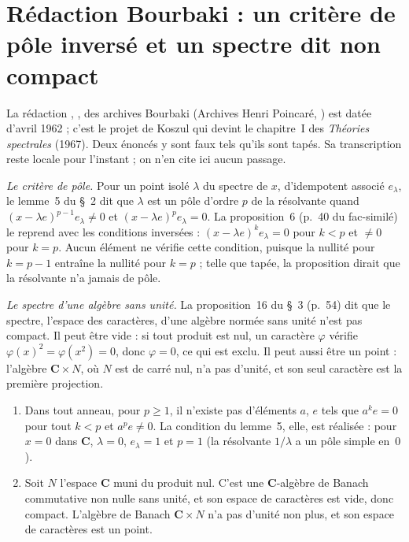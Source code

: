 \section[Rédaction Bourbaki \redac{380} : deux énoncés faux tels que tapés]{Rédaction Bourbaki  : un critère de pôle inversé et un spectre dit non compact\protect{}}\label{sec:bourbaki-380}

La rédaction , , des archives Bourbaki (Archives Henri Poincaré, ) est datée d'avril 1962 ; c'est le projet de Koszul qui devint le chapitre~I des \emph{Théories spectrales} (1967). Deux énoncés y sont faux tels qu'ils sont tapés. Sa transcription reste locale pour l'instant ; on n'en cite ici aucun passage.

\emph{Le critère de pôle.} Pour un point isolé $\lambda$ du spectre de $x$, d'idempotent associé $e_\lambda$, le lemme~5 du §~2 dit que $\lambda$ est un pôle d'ordre $p$ de la résolvante quand $(x - \lambda e)^{p-1} e_\lambda \neq 0$ et $(x - \lambda e)^p e_\lambda = 0$. La proposition~6 (p.~40 du fac-similé) le reprend avec les conditions inversées : $(x - \lambda e)^k e_\lambda = 0$ pour $k < p$ et $\neq 0$ pour $k = p$. Aucun élément ne vérifie cette condition, puisque la nullité pour $k = p - 1$ entraîne la nullité pour $k = p$ ; telle que tapée, la proposition dirait que la résolvante n'a jamais de pôle.

\emph{Le spectre d'une algèbre sans unité.} La proposition~16 du §~3 (p.~54) dit que le spectre, l'espace des caractères, d'une algèbre normée sans unité n'est pas compact. Il peut être vide : si tout produit est nul, un caractère $\varphi$ vérifie $\varphi(x)^2 = \varphi(x^2) = 0$, donc $\varphi = 0$, ce qui est exclu. Il peut aussi être un point : l'algèbre $\mathbf C \times N$, où $N$ est de carré nul, n'a pas d'unité, et son seul caractère est la première projection.

\begin{encadre}
\begin{contrexemple}\mbox{}
\begin{enumerate}
\item[a)] Dans tout anneau, pour $p \ge 1$, il n'existe pas d'éléments $a$, $e$ tels que $a^k e = 0$ pour tout $k < p$ et $a^p e \neq 0$. La condition du lemme~5, elle, est réalisée : pour $x = 0$ dans $\mathbf C$, $\lambda = 0$, $e_\lambda = 1$ et $p = 1$ (la résolvante $1/\lambda$ a un pôle simple en~$0$).
\item[b)] Soit $N$ l'espace $\mathbf C$ muni du produit nul. C'est une $\mathbf C$-algèbre de Banach commutative non nulle sans unité, et son espace de caractères est vide, donc compact. L'algèbre de Banach $\mathbf C \times N$ n'a pas d'unité non plus, et son espace de caractères est un point.
\end{enumerate}
\end{contrexemple}
\end{encadre}

